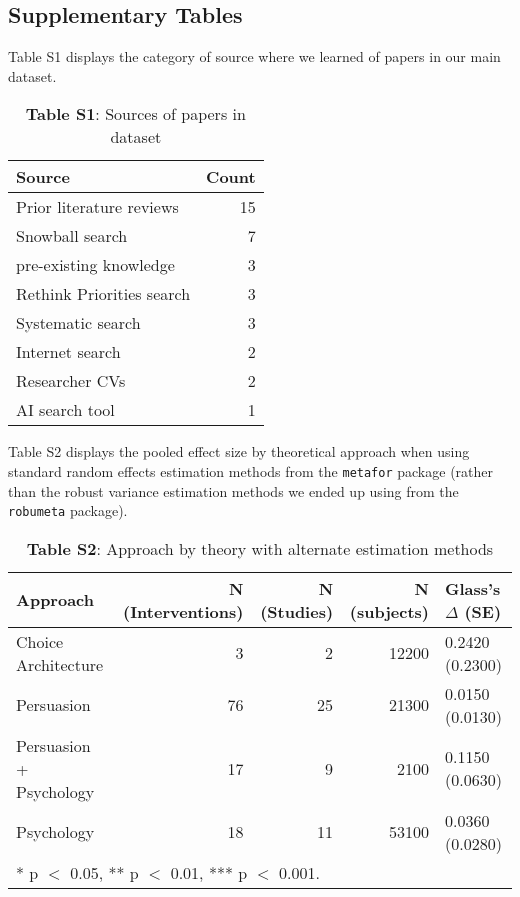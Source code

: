 \documentclass[sn-nature,referee,pdflatex]{sn-jnl}
\begin{document}
\subsection{Supplementary Tables}\label{supplementary-tables}

Table S1 displays the category of source where we learned of papers in
our main dataset. \captionsetup[table]{labelformat=empty}

\begin{table}[!h]
\centering
\caption{\label{tab:supp_table_one}\textbf{Table S1}: Sources of papers in dataset}
\centering
\begin{tabular}[t]{lr}
\toprule
Source & Count\\
\midrule
Prior literature reviews & 15\\
Snowball search & 7\\
pre-existing knowledge & 3\\
Rethink Priorities search & 3\\
Systematic search & 3\\
\addlinespace
Internet search & 2\\
Researcher CVs & 2\\
AI search tool & 1\\
\bottomrule
\end{tabular}
\end{table}

Table S2 displays the pooled effect size by theoretical approach when
using standard random effects estimation methods from the
\texttt{metafor} package (rather than the robust variance estimation
methods we ended up using from the \texttt{robumeta} package).

\begin{table}[!h]
\centering
\caption{\label{tab:supp_table_two}\textbf{Table S2}: Approach by theory with alternate estimation methods }
\centering
\begin{tabular}[t]{lrrrl}
\toprule
Approach & N (Interventions) & N (Studies) & N (subjects) & Glass's $\Delta$ (SE)\\
\midrule
Choice Architecture & 3 & 2 & 12200 & 0.2420 (0.2300)\\
Persuasion & 76 & 25 & 21300 & 0.0150 (0.0130)\\
Persuasion + Psychology & 17 & 9 & 2100 & 0.1150 (0.0630)\\
Psychology & 18 & 11 & 53100 & 0.0360 (0.0280)\\
\bottomrule
\multicolumn{5}{l}{\rule{0pt}{1em}* p $<$ 0.05, ** p $<$ 0.01, *** p $<$ 0.001.}\\
\end{tabular}
\end{table}
\end{document}
